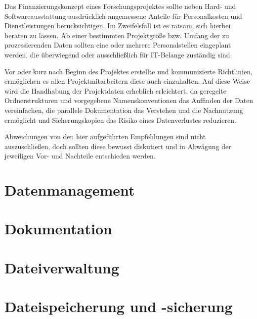 Das Finanzierungskonzept eines Forschungsprojektes sollte neben Hard- und Softwareausstattung ausdrücklich angemessene Anteile für Personalkosten und Dienstleistungen berücksichtigen. Im Zweifelsfall ist es ratsam, sich hierbei beraten zu lassen. Ab einer bestimmten Projektgröße bzw. Umfang der zu prozessierenden Daten sollten eine oder mehrere Personalstellen eingeplant werden, die überwiegend oder ausschließlich für IT-Belange zuständig sind. 

Vor oder kurz nach Beginn des Projektes erstellte und kommunizierte Richtlinien, ermöglichen es allen Projektmitarbeitern diese auch einzuhalten. Auf diese Weise wird die Handhabung der Projektdaten erheblich erleichtert, da geregelte Ordnerstrukturen und vorgegebene Namenskonventionen das Auffinden der Daten vereinfachen, die parallele Dokumentation das Verstehen und die Nachnutzung ermöglicht und Sicherungskopien das Risiko eines Datenverlustes reduzieren.

Abweichungen von den hier aufgeführten Empfehlungen sind nicht auszuschließen, doch sollten diese bewusst diskutiert und in Abwägung der jeweiligen Vor- und Nachteile entschieden werden.

\newpage
\section{Datenmanagement}\label{datenmanagement}



\newpage
\section{Dokumentation}\label{Metadaten-allgemein}




\newpage
\section{Dateiverwaltung}\label{dateiverwaltung}




\newpage
\section{Dateispeicherung und -sicherung}\label{dateispeicherung}

